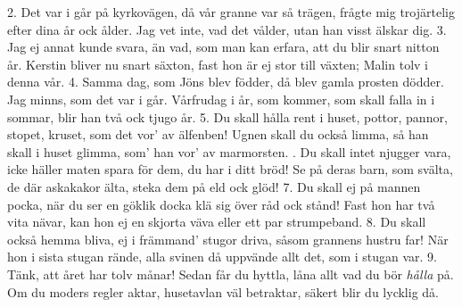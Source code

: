 \setlength{\columnsep}{1cm}
\begin{multicols}{2}
2.  Det var i går på kyrkovägen,
    då vår granne var så trägen,
    frågte mig trojärtelig
    efter dina år ock ålder.
    Jag vet inte, vad det vålder,
    utan han visst älskar dig.
3.  Jag ej annat kunde svara,
    än vad, som man kan erfara,
    att du blir snart nitton år.
    Kerstin bliver nu snart säxton,
    fast hon är ej stor till växten;
    Malin tolv i denna vår.
4.  Samma dag, som Jöns blev födder,
    då blev gamla prosten dödder.
    Jag minns, som det var i går.
    Vårfrudag i år, som kommer,
    som skall falla in i sommar,
    blir han två ock tjugo år.
5.  Du skall hålla rent i huset,
    pottor, pannor, stopet, kruset,
    som det vor’ av älfenben!
    Ugnen skall du också limma,
    så han skall i huset glimma,
    som’ han vor’ av marmorsten.
\vfill{}.  Du skall intet njugger vara,
    icke häller maten spara
    för dem, du har i ditt bröd!
    Se på deras barn, som svälta,
    de där askakakor älta,
    steka dem på eld ock glöd!
7.  Du skall ej på mannen pocka,
    när du ser en göklik docka
    klä sig över råd ock stånd!
    Fast hon har två vita nävar,
    kan hon ej en skjorta väva
    eller ett par strumpeband.
8.  Du skall också hemma bliva,
    ej i främmand’ stugor driva,
    såsom grannens hustru far!
    När hon i sista stugan rände,
    alla svinen då uppvände
    allt det, som i stugan var.
9.  Tänk, att året har tolv månar!
    Sedan får du hyttla, låna
    allt vad du bör \textit{hålla} på.
    Om du moders regler aktar,
    husetavlan väl betraktar,
    säkert blir du lycklig då.
\end{multicols}
